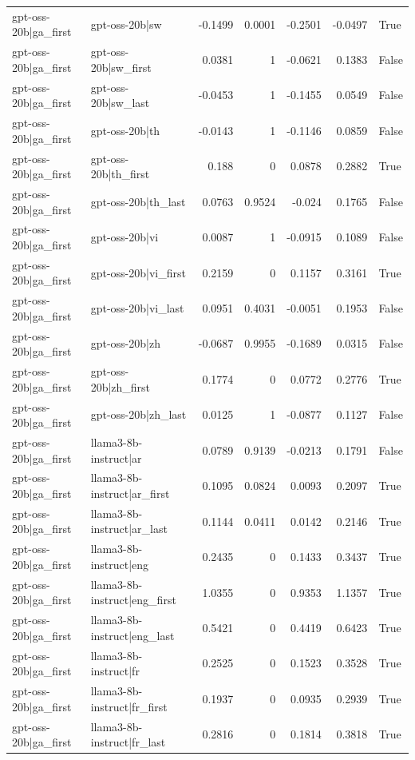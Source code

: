 \begin{table}
\begin{tabular}{l l r r r r l}
gpt-oss-20b|ga_first & gpt-oss-20b|sw & -0.1499 & 0.0001 & -0.2501 & -0.0497 & True \\
gpt-oss-20b|ga_first & gpt-oss-20b|sw_first & 0.0381 & 1 & -0.0621 & 0.1383 & False \\
gpt-oss-20b|ga_first & gpt-oss-20b|sw_last & -0.0453 & 1 & -0.1455 & 0.0549 & False \\
gpt-oss-20b|ga_first & gpt-oss-20b|th & -0.0143 & 1 & -0.1146 & 0.0859 & False \\
gpt-oss-20b|ga_first & gpt-oss-20b|th_first & 0.188 & 0 & 0.0878 & 0.2882 & True \\
gpt-oss-20b|ga_first & gpt-oss-20b|th_last & 0.0763 & 0.9524 & -0.024 & 0.1765 & False \\
gpt-oss-20b|ga_first & gpt-oss-20b|vi & 0.0087 & 1 & -0.0915 & 0.1089 & False \\
gpt-oss-20b|ga_first & gpt-oss-20b|vi_first & 0.2159 & 0 & 0.1157 & 0.3161 & True \\
gpt-oss-20b|ga_first & gpt-oss-20b|vi_last & 0.0951 & 0.4031 & -0.0051 & 0.1953 & False \\
gpt-oss-20b|ga_first & gpt-oss-20b|zh & -0.0687 & 0.9955 & -0.1689 & 0.0315 & False \\
gpt-oss-20b|ga_first & gpt-oss-20b|zh_first & 0.1774 & 0 & 0.0772 & 0.2776 & True \\
gpt-oss-20b|ga_first & gpt-oss-20b|zh_last & 0.0125 & 1 & -0.0877 & 0.1127 & False \\
gpt-oss-20b|ga_first & llama3-8b-instruct|ar & 0.0789 & 0.9139 & -0.0213 & 0.1791 & False \\
gpt-oss-20b|ga_first & llama3-8b-instruct|ar_first & 0.1095 & 0.0824 & 0.0093 & 0.2097 & True \\
gpt-oss-20b|ga_first & llama3-8b-instruct|ar_last & 0.1144 & 0.0411 & 0.0142 & 0.2146 & True \\
gpt-oss-20b|ga_first & llama3-8b-instruct|eng & 0.2435 & 0 & 0.1433 & 0.3437 & True \\
gpt-oss-20b|ga_first & llama3-8b-instruct|eng_first & 1.0355 & 0 & 0.9353 & 1.1357 & True \\
gpt-oss-20b|ga_first & llama3-8b-instruct|eng_last & 0.5421 & 0 & 0.4419 & 0.6423 & True \\
gpt-oss-20b|ga_first & llama3-8b-instruct|fr & 0.2525 & 0 & 0.1523 & 0.3528 & True \\
gpt-oss-20b|ga_first & llama3-8b-instruct|fr_first & 0.1937 & 0 & 0.0935 & 0.2939 & True \\
gpt-oss-20b|ga_first & llama3-8b-instruct|fr_last & 0.2816 & 0 & 0.1814 & 0.3818 & True \\

\end{tabular}
\end{table}
